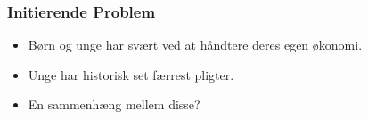\begin{frame}
\frametitle{Initierende Problem}
    \begin{itemize}
        \item{Børn og unge har svært ved at håndtere deres egen økonomi.}
        \vspace{\baselineskip}
        \item{Unge har historisk set færrest pligter.}
        \vspace{\baselineskip}
        \item{En sammenhæng mellem disse?}
        
    \end{itemize}
\end{frame}

